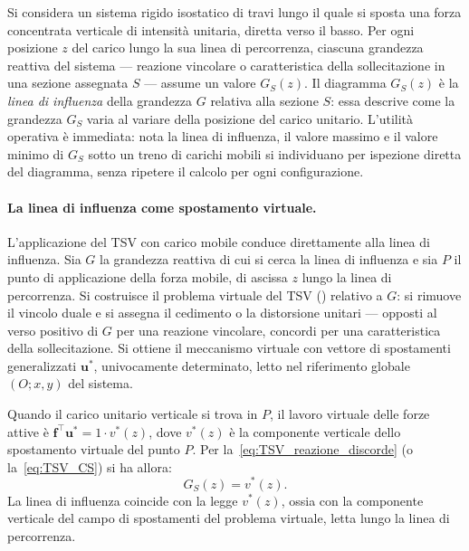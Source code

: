 Si considera un sistema rigido isostatico di travi lungo
il quale si sposta una forza concentrata verticale di
intensità unitaria, diretta verso il basso. Per ogni
posizione $z$ del carico lungo la sua linea di
percorrenza, ciascuna grandezza reattiva del sistema ---
reazione vincolare o caratteristica della sollecitazione
in una sezione assegnata $S$ --- assume un valore
$G_S(z)$. Il diagramma $G_S(z)$ è la \emph{linea di
	influenza} della grandezza $G$ relativa alla sezione $S$:
essa descrive come la grandezza $G_S$ varia al variare
della posizione del carico unitario. L'utilità operativa
è immediata: nota la linea di influenza, il valore massimo
e il valore minimo di $G_S$ sotto un treno di carichi
mobili si individuano per ispezione diretta del diagramma,
senza ripetere il calcolo per ogni configurazione.


\paragraph{La linea di influenza come spostamento virtuale.}
L'applicazione del TSV con carico mobile conduce
direttamente alla linea di influenza. Sia $G$ la grandezza
reattiva di cui si cerca la linea di influenza e sia $P$ il
punto di applicazione della forza mobile, di ascissa $z$
lungo la linea di percorrenza. Si costruisce il problema
virtuale del TSV () relativo a $G$: si
rimuove il vincolo duale e si assegna il cedimento o la
distorsione unitari --- opposti al verso positivo di $G$
per una reazione vincolare, concordi per una caratteristica
della sollecitazione. Si ottiene il meccanismo virtuale con
vettore di spostamenti generalizzati $\bm{u}^*$, univocamente
determinato, letto nel riferimento globale $(O; x, y)$ del
sistema.

Quando il carico unitario verticale si trova in $P$, il
lavoro virtuale delle forze attive è $\bm{f}^\top\bm{u}^*
= 1 \cdot v^*(z)$, dove $v^*(z)$ è la componente verticale
dello spostamento virtuale del punto $P$. Per
la~\eqref{eq:TSV_reazione_discorde} (o la~\eqref{eq:TSV_CS})
si ha allora:
\begin{equation}\label{eq:LI_formula}
	\boxed{\,G_S(z) = v^*(z).\,}
\end{equation}
La linea di influenza coincide con la legge $v^*(z)$,
ossia con la componente verticale del campo di spostamenti
del problema virtuale, letta lungo la linea di percorrenza.


